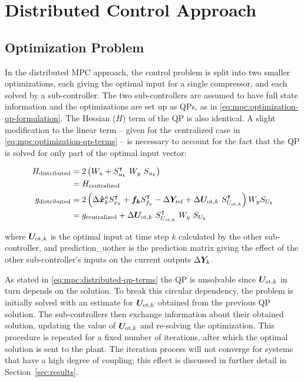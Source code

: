 \section{Distributed Control Approach}
\label{sec:mpc:distributed}

\subsection{Optimization Problem}

In the distributed MPC approach, the control problem is split into two smaller optimizations, each giving the optimal input for a single compressor, and each solved by a sub-controller.
The two sub-controllers are assumed to have full state information and the optimizations are set up as QPs, as in \eqref{eq:mpc:optimization-qp-formulation}. The Hessian ($H$) term of the QP is also identical. A slight modification to the linear term -- given for the centralized case in \eqref{eq:mpc:optimization-qp-terms} -- is necessary to account for the fact that the QP is solved for only part of the optimal input vector:

\begin{equation}
  \begin{split}
    H\ut{distributed} & = 2\left( W_u + S_{u_k}^\intercal\ W_y\ S_{u_k} \right)\\
    & = H\ut{centralized}\\
    g\ut{distributed} & = 2\left( \Delta\vc{\hat{x}}_k^a S_{x_k}^\intercal + \vc{f_k} S_{f_k}^\intercal - \Delta \vc{Y}\ut{ref} + \Delta\vc{U}_{\text{ot},k}\ S_{U_{\text{ot},k}}^\intercal \right)W_y S_{U_k}\\
    & = g\ut{centralized} + \Delta\vc{U}_{\text{ot},k}\ S_{U_{\text{ot},k}}^\intercal\ W_y\ S_{U_k}
  \end{split}
  \label{eq:mpc:distributed-qp-terms}
\end{equation}

\noindent where $\bm{U}_{\text{ot},k}$ is the optimal input at time step $k$ calculated by the other sub-controller, and \gls{prediction_uother} is the prediction matrix giving the effect of the other sub-controller's inputs on the current outputs $\Delta \bm{Y}_k$.

As stated in \eqref{eq:mpc:distributed-qp-terms} the QP is unsolvable since  $\bm{U}_{\text{ot},k}$ in turn depends on the solution.
To break this circular dependency, the problem is initially solved with an estimate for $\bm{U}_{\text{ot},k}$ obtained from the previous QP solution.
The sub-controllers then exchange information about their obtained solution, updating the value of $\bm{U}_{\text{ot},k}$ and re-solving the optimization.
This procedure is repeated for a fixed number of iterations, after which the optimal solution is sent to the plant.
The iteration process will not converge for systems that have a high degree of coupling; this effect is discussed in further detail in Section~\ref{sec:results}.

